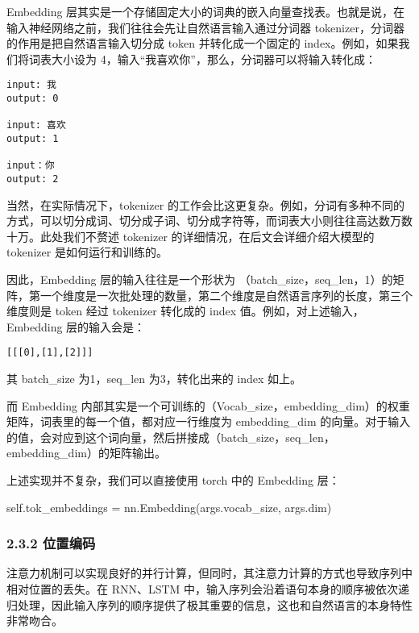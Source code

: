 \documentclass[
]{article}
\newenvironment{Shaded}{}{}
\newcommand{\NormalTok}[1]{#1}
\newcommand{\OperatorTok}[1]{\textcolor[rgb]{0.40,0.40,0.40}{#1}}
\newcommand{\VariableTok}[1]{\textcolor[rgb]{0.10,0.09,0.49}{#1}}
\begin{document}
Embedding
层其实是一个存储固定大小的词典的嵌入向量查找表。也就是说，在输入神经网络之前，我们往往会先让自然语言输入通过分词器
tokenizer，分词器的作用是把自然语言输入切分成 token 并转化成一个固定的
index。例如，如果我们将词表大小设为
4，输入``我喜欢你''，那么，分词器可以将输入转化成：

\begin{verbatim}
input: 我
output: 0

input: 喜欢
output: 1

input：你
output: 2
\end{verbatim}

当然，在实际情况下，tokenizer
的工作会比这更复杂。例如，分词有多种不同的方式，可以切分成词、切分成子词、切分成字符等，而词表大小则往往高达数万数十万。此处我们不赘述
tokenizer 的详细情况，在后文会详细介绍大模型的 tokenizer
是如何运行和训练的。

因此，Embedding 层的输入往往是一个形状为
（batch\_size，seq\_len，1）的矩阵，第一个维度是一次批处理的数量，第二个维度是自然语言序列的长度，第三个维度则是
token 经过 tokenizer 转化成的 index 值。例如，对上述输入，Embedding
层的输入会是：

\begin{verbatim}
[[[0],[1],[2]]]
\end{verbatim}

其 batch\_size 为1，seq\_len 为3，转化出来的 index 如上。

而 Embedding
内部其实是一个可训练的（Vocab\_size，embedding\_dim）的权重矩阵，词表里的每一个值，都对应一行维度为
embedding\_dim
的向量。对于输入的值，会对应到这个词向量，然后拼接成（batch\_size，seq\_len，embedding\_dim）的矩阵输出。

上述实现并不复杂，我们可以直接使用 torch 中的 Embedding 层：

\begin{Shaded}
\begin{Highlighting}[]
\VariableTok{self}\NormalTok{.tok\_embeddings }\OperatorTok{=}\NormalTok{ nn.Embedding(args.vocab\_size, args.dim)}
\end{Highlighting}
\end{Shaded}

\subsubsection{2.3.2 位置编码}\label{ux4f4dux7f6eux7f16ux7801}

注意力机制可以实现良好的并行计算，但同时，其注意力计算的方式也导致序列中相对位置的丢失。在
RNN、LSTM
中，输入序列会沿着语句本身的顺序被依次递归处理，因此输入序列的顺序提供了极其重要的信息，这也和自然语言的本身特性非常吻合。
\end{document}
